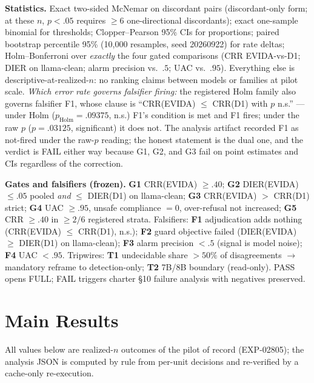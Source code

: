 \documentclass[sigconf,nonacm]{acmart}
\begin{document}
\textbf{Statistics.} Exact two-sided McNemar on discordant pairs
(discordant-only form; at these $n$, $p{<}.05$ requires ${\ge}6$
one-directional discordants); exact one-sample binomial for thresholds;
Clopper--Pearson 95\% CIs for proportions; paired bootstrap percentile
95\% (10{,}000 resamples, seed 20260922) for rate deltas; Holm--Bonferroni
over \emph{exactly} the four gated comparisons (CRR EVIDA-vs-D1; DIER on
llama-clean; alarm precision vs.\ $.5$; UAC vs.\ $.95$). Everything else
is descriptive-at-realized-$n$: no ranking claims between models or
families at pilot scale. \emph{Which error rate governs falsifier
firing:} the registered Holm family also governs falsifier F1, whose
clause is ``CRR(EVIDA) $\le$ CRR(D1) with $p$ n.s.'' --- under Holm
($p_{\mathrm{Holm}}{=}.09375$, n.s.) F1's condition is met and F1 fires;
under the raw $p$ ($p{=}.03125$, significant) it does not. The analysis
artifact recorded F1 as not-fired under the raw-$p$ reading; the honest
statement is the dual one, and the verdict is FAIL either way because G1,
G2, and G3 fail on point estimates and CIs regardless of the correction.

\textbf{Gates and falsifiers (frozen).} \textbf{G1} CRR(EVIDA)
${\ge}.40$; \textbf{G2} DIER(EVIDA) ${\le}.05$ pooled \emph{and}
${\le}$ DIER(D1) on llama-clean; \textbf{G3} CRR(EVIDA) $>$ CRR(D1)
strict; \textbf{G4} UAC ${\ge}.95$, unsafe compliance $=0$, over-refusal
not increased; \textbf{G5} CRR ${\ge}.40$ in ${\ge}2/6$ registered strata.
Falsifiers: \textbf{F1} adjudication adds nothing (CRR(EVIDA)
${\le}$ CRR(D1), n.s.); \textbf{F2} guard objective failed (DIER(EVIDA)
${\ge}$ DIER(D1) on llama-clean); \textbf{F3} alarm precision ${<}.5$
(signal is model noise); \textbf{F4} UAC ${<}.95$. Tripwires: \textbf{T1}
undecidable share $>50\%$ of disagreements $\to$ mandatory reframe to
detection-only; \textbf{T2} 7B/8B boundary (read-only). PASS opens FULL;
FAIL triggers charter \S10 failure analysis with negatives preserved.

\section{Main Results}\label{sec:results}
All values below are realized-$n$ outcomes of the pilot of record
(EXP-02805); the analysis JSON is computed by rule from per-unit decisions
and re-verified by a cache-only re-execution.
\end{document}
